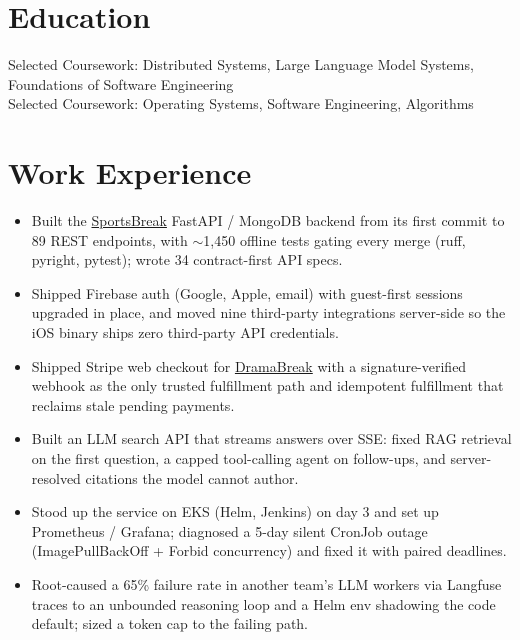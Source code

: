 \documentclass[11pt, letterpaper]{article}
\begin{document}

\section{Education}
Selected Coursework: Distributed Systems, Large Language Model Systems, Foundations of Software Engineering\\[1pt]
Selected Coursework: Operating Systems, Software Engineering, Algorithms

\section{Work Experience}
\begin{itemize}
  \item Built the \href{https://apps.apple.com/app/id6762649287}{SportsBreak} FastAPI / MongoDB backend from its first commit to 89 REST endpoints, with $\sim$1{,}450 offline tests gating every merge (ruff, pyright, pytest); wrote 34 contract-first API specs.
  \item Shipped Firebase auth (Google, Apple, email) with guest-first sessions upgraded in place, and moved nine third-party integrations server-side so the iOS binary ships zero third-party API credentials.
  \item Shipped Stripe web checkout for \href{https://apps.apple.com/app/id6758861738}{DramaBreak} with a signature-verified webhook as the only trusted fulfillment path and idempotent fulfillment that reclaims stale pending payments.
  \item Built an LLM search API that streams answers over SSE: fixed RAG retrieval on the first question, a capped tool-calling agent on follow-ups, and server-resolved citations the model cannot author.
  \item Stood up the service on EKS (Helm, Jenkins) on day 3 and set up Prometheus / Grafana; diagnosed a 5-day silent CronJob outage (ImagePullBackOff + Forbid concurrency) and fixed it with paired deadlines.
  \item Root-caused a 65\% failure rate in another team's LLM workers via Langfuse traces to an unbounded reasoning loop and a Helm env shadowing the code default; sized a token cap to the failing path.
\end{itemize}
\end{document}
